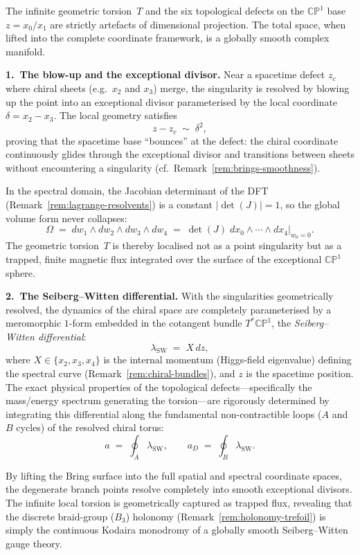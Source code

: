 \begin{remark}
\label{rem:seiberg-witten}
The infinite geometric torsion~$T$ and the six topological defects on the
$\mathbb{CP}^1$ base $z=x_0/x_1$ are strictly artefacts of
dimensional projection.  The total space, when lifted into the
complete coordinate framework, is a globally smooth complex manifold.

\medskip
\noindent\textbf{1.~The blow-up and the exceptional divisor.}\;
Near a spacetime defect $z_c$ where chiral sheets (e.g.\ $x_2$ and
$x_3$) merge, the singularity is resolved by blowing up the point into
an exceptional divisor parameterised by the local coordinate
$\delta=x_2-x_3$.  The local geometry satisfies
\[
  z-z_c\;\sim\;\delta^2,
\]
proving that the spacetime base ``bounces'' at the defect: the chiral
coordinate continuously glides through the exceptional divisor and
transitions between sheets without encountering a singularity
(cf.\ Remark~\ref{rem:brings-smoothness}).

In the spectral domain, the Jacobian determinant of the DFT
(Remark~\ref{rem:lagrange-resolvents}) is a constant
$\lvert\det(J)\rvert=1$, so the global volume form never collapses:
\[
  \Omega \;=\; dw_1\wedge dw_2\wedge dw_3\wedge dw_4
  \;=\; \det(J)\;dx_0\wedge\cdots\wedge dx_4\Big|_{w_0=0}.
\]
The geometric torsion~$T$ is thereby localised not as a point
singularity but as a trapped, finite magnetic flux integrated over
the surface of the exceptional $\mathbb{CP}^1$ sphere.

\medskip
\noindent\textbf{2.~The Seiberg--Witten differential.}\;
With the singularities geometrically resolved, the dynamics of the chiral
space are completely parameterised by a meromorphic $1$-form embedded in
the cotangent bundle $T^{*}\mathbb{CP}^1$, the \emph{Seiberg--Witten
differential}:
\begin{equation}\label{eq:seiberg-witten-differential}
  \lambda_{\mathrm{SW}} \;=\; X\,dz,
\end{equation}
where $X\in\{x_2,x_3,x_4\}$ is the internal momentum (Higgs-field
eigenvalue) defining the spectral curve
(Remark~\ref{rem:chiral-bundles}), and $z$ is the spacetime position.
The exact physical properties of the topological defects---specifically
the mass/energy spectrum generating the torsion---are rigorously
determined by integrating this differential along the fundamental
non-contractible loops ($A$ and $B$ cycles) of the resolved chiral
torus:
\begin{equation}\label{eq:seiberg-witten-periods}
  a \;=\; \oint_{A}\lambda_{\mathrm{SW}},
  \qquad
  a_D \;=\; \oint_{B}\lambda_{\mathrm{SW}}.
\end{equation}

By lifting the Bring surface into the full spatial and spectral
coordinate spaces, the degenerate branch points resolve completely into
smooth exceptional divisors.  The infinite local torsion is geometrically
captured as trapped flux, revealing that the discrete braid-group
($B_3$) holonomy (Remark~\ref{rem:holonomy-trefoil}) is simply the
continuous Kodaira monodromy of a globally smooth Seiberg--Witten gauge
theory.
\end{remark}

